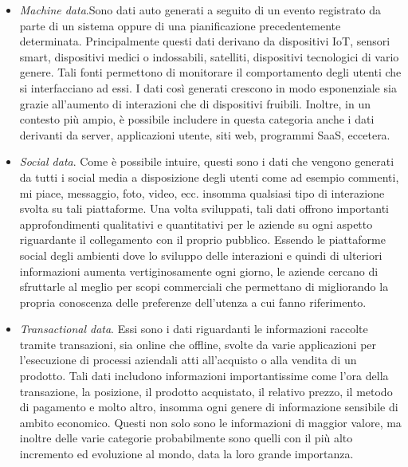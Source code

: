 \begin{itemize}
    \item \textit{Machine data}.Sono dati auto generati a seguito di un evento registrato da parte di un sistema oppure di una pianificazione precedentemente determinata. Principalmente questi dati derivano da dispositivi IoT, sensori smart, dispositivi medici o indossabili, satelliti, dispositivi tecnologici di vario genere. Tali fonti permettono di monitorare il comportamento degli utenti che si interfacciano ad essi. I dati così generati crescono in modo esponenziale sia grazie all’aumento di interazioni che di dispositivi fruibili. Inoltre, in un contesto più ampio, è possibile includere in questa categoria anche i dati derivanti da server, applicazioni utente, siti web, programmi SaaS, eccetera.
    \item \textit{Social data}. Come è possibile intuire, questi sono i dati che vengono generati da tutti i social media a disposizione degli utenti come ad esempio commenti, mi piace, messaggio, foto, video, ecc. insomma qualsiasi tipo di interazione svolta su tali piattaforme. Una volta sviluppati, tali dati offrono importanti approfondimenti qualitativi e quantitativi per le aziende su ogni aspetto riguardante il collegamento con il proprio pubblico. Essendo le piattaforme social degli ambienti dove lo sviluppo delle interazioni e quindi di ulteriori informazioni aumenta vertiginosamente ogni giorno, le aziende cercano di sfruttarle al meglio per scopi commerciali che permettano di migliorando la propria conoscenza delle preferenze dell’utenza a cui fanno riferimento.
    \item \textit{Transactional data}. Essi sono i dati riguardanti le informazioni raccolte tramite transazioni, sia online che offline, svolte da varie applicazioni per l’esecuzione di processi aziendali atti all’acquisto o alla vendita di un prodotto. Tali dati includono informazioni importantissime come l’ora della transazione, la posizione, il prodotto acquistato, il relativo prezzo, il metodo di pagamento e molto altro, insomma ogni genere di informazione sensibile di ambito economico. Questi non solo sono le informazioni di maggior valore, ma inoltre delle varie categorie probabilmente sono quelli con il più alto incremento ed evoluzione al mondo, data la loro grande importanza.
\end{itemize}

